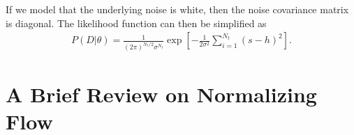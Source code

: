 \documentclass[11pt,a4paper]{article}
\begin{document}
If we model that the underlying noise is white, then the noise covariance matrix is diagonal. The likelihood function can then be simplified as
\begin{align}
P(D | \theta)
= \frac{1}{(2\pi)^{N_t/2} \sigma^{N_t}}  \exp\left[ - \frac{1}{2\sigma^2} \sum_{i=1}^{N_t} (s - h)^2 \right]  .
\end{align}





\section{A Brief Review on Normalizing Flow}
\cite{Papamakarios:2019fms}










\end{document}
